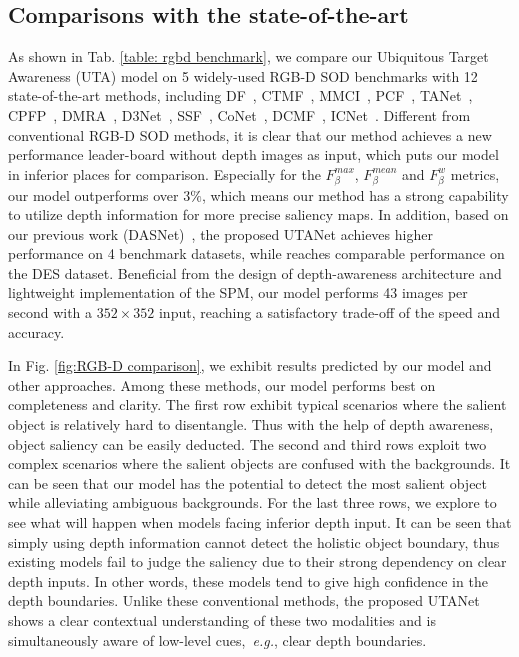 \documentclass[journal]{IEEEtran}
\def\eg{{\em e.g.}}
\newcommand{\figref}[1]{Fig. \ref{#1}}
\newcommand{\tabref}[1]{Tab. \ref{#1}}
\begin{document}
\subsection{Comparisons with the state-of-the-art}

 As shown in \tabref{table: rgbd benchmark}, we compare our Ubiquitous Target Awareness (UTA) model on 5 widely-used RGB-D SOD benchmarks with 12 state-of-the-art methods, including DF~\cite{qu2017rgbd}, CTMF~\cite{han2017cnns}, MMCI~\cite{chen2019multi}, PCF~\cite{chen2018progressively}, TANet~\cite{chen2019three}, CPFP~\cite{zhao2019contrast}, DMRA~\cite{piao2019depth}, D3Net~\cite{fan2019D3Net}, SSF~\cite{zhang2020select}, CoNet~\cite{Wei2020ECCV}, DCMF~\cite{chen2020rgbd}, ICNet~\cite{li2020icnet}.
 Different from conventional RGB-D SOD methods, it is clear that our method achieves a new performance leader-board without depth images as input, which puts our model in inferior places for comparison.
Especially for the $F_\beta^{max}$, $F_\beta^{mean}$ and $F_\beta^{w}$ metrics, our model outperforms over $3\%$, which means our method has a strong capability to utilize depth information for more precise saliency maps.
In addition, based on our previous work (DASNet)~\cite{oursMM}, the proposed UTANet achieves higher performance on 4 benchmark datasets, while reaches comparable performance on the DES dataset. Beneficial from the design of depth-awareness architecture and lightweight implementation of the SPM, our model performs 43 images per second with a $352 \times 352$ input, reaching a satisfactory trade-off of the speed and accuracy.



In \figref{fig:RGB-D comparison}, we exhibit results predicted by our model and other approaches. Among these methods, our model performs best on completeness and clarity. The first row exhibit typical scenarios where the salient object is relatively hard to disentangle. Thus with the help of depth awareness, object saliency can be easily deducted.
The second and third rows exploit two complex scenarios where the salient objects are confused with the backgrounds. It can be seen that our model has the potential to detect the most salient object while alleviating ambiguous backgrounds.
For the last three rows, we explore to see what will happen when models facing inferior depth input. It can be seen that simply using depth information cannot detect the holistic object boundary, thus existing models fail to judge the saliency due to their strong dependency on clear depth inputs. In other words, these models tend to give high confidence in the depth boundaries. Unlike these conventional methods, the proposed UTANet shows a clear contextual understanding of these two modalities and is simultaneously aware of low-level cues,~\eg, clear depth boundaries.
\end{document}
